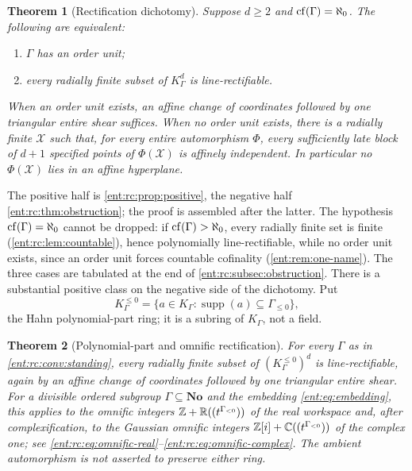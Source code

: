 \documentclass[11pt]{article}
\newtheorem{theorem}{Theorem}[section]
\theoremstyle{plain}
\theoremstyle{plain}
\theoremstyle{plain}
\theoremstyle{definition}
\theoremstyle{definition}
\theoremstyle{definition}
\theoremstyle{definition}
\theoremstyle{remark}
\newcommand{\C}{\mathbb C}\newcommand{\R}{\mathbb R}
\newcommand{\No}{\mathbf{No}}
\newcommand{\K}{K_\Gamma}\newcommand{\KD}{K_\Delta}
\DeclareMathOperator{\supp}{supp}\DeclareMathOperator{\lc}{lc}
\newcommand{\Kle}{K_\Gamma^{\le0}}\DeclareMathOperator{\Jac}{Jac}
\begin{document}
\begin{theorem}[Rectification dichotomy]\label{ent:rc:thm:main}
Suppose $d\ge2$ and $\operatorname{cf}(\Gamma)=\aleph_0$. The following are equivalent:
\begin{enumerate}[label=\textnormal{(\roman*)},leftmargin=2em]
\item $\Gamma$ has an order unit;
\item every radially finite subset of $\K^d$ is line-rectifiable.
\end{enumerate}
When an order unit exists, an affine change of coordinates followed by one
triangular entire shear suffices. When no order unit exists, there is a
radially finite $\mathcal X$ such that, for every entire automorphism $\Phi$,
every sufficiently late block of $d+1$ specified points of
$\Phi(\mathcal X)$ is affinely independent. In particular no
$\Phi(\mathcal X)$ lies in an affine hyperplane.
\end{theorem}

The positive half is \cref{ent:rc:prop:positive}, the negative half
\cref{ent:rc:thm:obstruction}; the proof is assembled after the latter. The
hypothesis $\operatorname{cf}(\Gamma)=\aleph_0$ cannot be dropped: if
$\operatorname{cf}(\Gamma)>\aleph_0$, every radially finite set is finite
(\cref{ent:rc:lem:countable}), hence polynomially line-rectifiable, while no
order unit exists, since an order unit forces countable cofinality
(\cref{ent:rem:one-name}). The three cases are tabulated at the end of
\cref{ent:rc:subsec:obstruction}. There is a substantial positive class on
the negative side of the dichotomy. Put
\begin{equation}\label{ent:rc:eq:Kle}
 \Kle=\{a\in\K:\supp(a)\subseteq\Gamma_{\le0}\},
\end{equation}
the Hahn polynomial-part ring; it is a subring of $\K$, not a field.

\begin{theorem}[Polynomial-part and omnific rectification]
\label{ent:rc:thm:omnific-main}
For every $\Gamma$ as in \cref{ent:rc:conv:standing}, every radially finite
subset of $(\Kle)^d$ is line-rectifiable, again by an affine change of
coordinates followed by one triangular entire shear. For a divisible ordered
subgroup $\Gamma\subseteq\No$ and the embedding \eqref{ent:eq:embedding},
this applies to the omnific integers
$\Z+\R((t^{\Gamma_{<0}}))$ of the real workspace and, after
complexification, to the Gaussian omnific integers
$\Z[i]+\C((t^{\Gamma_{<0}}))$ of the complex one; see
\eqref{ent:rc:eq:omnific-real}--\eqref{ent:rc:eq:omnific-complex}. The
ambient automorphism is not asserted to preserve either ring.
\end{theorem}
\end{document}
